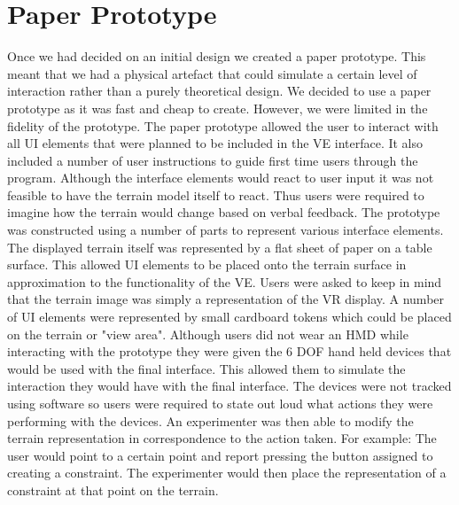 \documentclass{article}
\begin{document}
\section{Paper Prototype}
Once we had decided on an initial design we created a paper prototype. This meant that we had a physical artefact that could simulate a certain level of interaction rather than a purely theoretical design. We decided to use a paper prototype as it was fast and cheap to create. However, we were limited in the fidelity of the prototype.
\newline\newline
The paper prototype allowed the user to interact with all UI elements that were planned to be included in the VE interface. It also included a number of user instructions to guide first time users through the program. Although the interface elements would react to user input it was not feasible to have the terrain model itself to react. Thus users were required to imagine how the terrain would change based on verbal feedback.
\newline\newline
The prototype was constructed using a number of parts to represent various interface elements. The displayed terrain itself was represented by a flat sheet of paper on a table surface. This allowed UI elements to be placed onto the terrain surface in approximation to the functionality of the VE. Users were asked to keep in mind that the terrain image was simply a representation of the VR display. A number of UI elements were represented by small cardboard tokens which could be placed on the terrain or "view area".
\newline\newline
Although users did not wear an HMD while interacting with the prototype they were given the 6 DOF hand held devices that would be used with the final interface. This allowed them to simulate the interaction they would have with the final interface. The devices were not tracked using software so users were required to state out loud what actions they were performing with the devices. An experimenter was then able to modify the terrain representation in correspondence to the action taken. For example: The user would point to a certain point and report pressing the button assigned to creating a constraint. The experimenter would then place the representation of a constraint at that point on the terrain.
\end{document}
